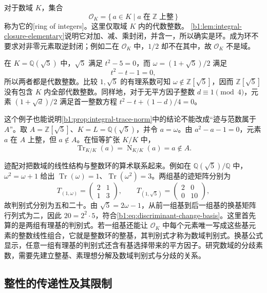对于数域 \(K\)，集合
\[
	\mathcal O_K=\{\,a\in K\mid a\;\text{在}\;\mathbb Z\;\text{上整}\,\}
\]
称为它的[ring of integers]。这里仅取域 \(K\) 内的代数整数。
\cref{b1:lem:integral-closure-elementary}说明它对加、减、乘封闭，并含一，所以确实是环。成为环不要求对非零元素取逆封闭；例如二在 \(\mathcal O_K\) 中，\(1/2\) 却不在其中，故 \(\mathcal O_K\) 不是域。

\ProseParagraphBreak
在 \(K=\mathbb Q(\sqrt5)\) 中，\(\sqrt5\) 满足 \(t^2-5=0\)，而 \(\omega=(1+\sqrt5)/2\) 满足
\[
	t^2-t-1=0,
\]
所以两者都是代数整数。比较 \(1,\sqrt5\) 的有理系数可知 \(\omega\notin\mathbb Z[\sqrt5]\)，因而 \(\mathbb Z[\sqrt5]\) 没有包含 \(K\) 内全部代数整数。同样地，对于无平方因子整数 \(d\equiv1\pmod4\)，元素 \((1+\sqrt d)/2\) 满足首一整数方程 \(t^2-t+(1-d)/4=0\)。

\ProseParagraphBreak
这个例子也能说明\cref{b1:prop:integral-trace-norm}中的结论不能改成“迹与范数属于 \(A\)”。取 \(A=\mathbb Z[\sqrt5]\)、\(K=L=\mathbb Q(\sqrt5)\)，并令 \(a=\omega\)。由 \(a^2-a-1=0\)，元素 \(a\) 在 \(A\) 上整，但 \(a\notin A\)。在恒等扩张 \(K/K\) 中，
\[
	\operatorname{Tr}_{K/K}(a)=\operatorname{N}_{K/K}(a)=a\notin A.
\]

\ProseParagraphBreak
迹配对把数域的线性结构与整数环的算术联系起来。例如在 \(\mathbb Q(\sqrt5)/\mathbb Q\) 中，\(\omega^2=\omega+1\) 给出 \(\operatorname{Tr}(\omega)=1\)、\(\operatorname{Tr}(\omega^2)=3\)。两组基的迹矩阵分别为
\[
	T_{(1,\omega)}=\begin{pmatrix}2&1\\1&3\end{pmatrix},\qquad
	T_{(1,\sqrt5)}=\begin{pmatrix}2&0\\0&10\end{pmatrix},
\]
故判别式分别为五和二十。由 \(\sqrt5=2\omega-1\)，从前一组基到后一组基的换基矩阵行列式为二，因此 \(20=2^2\cdot5\)，符合\eqref{b1:eq:discriminant-change-basis}。这里首先算的是两组有理基的判别式。若一组基还能让 \(\mathcal O_K\) 中每个元素唯一写成这些基元素的整数线性组合，它就是整数环的整基，其判别式才称为数域判别式。换基公式显示，任意一组有理基的判别式还含有基选择带来的平方因子。研究数域的分歧素数，需要先建立整基、素理想分解及数域判别式与分歧的关系。

\subsection{整性的传递性及其限制}
\label{b1:subsec:1804:04}

